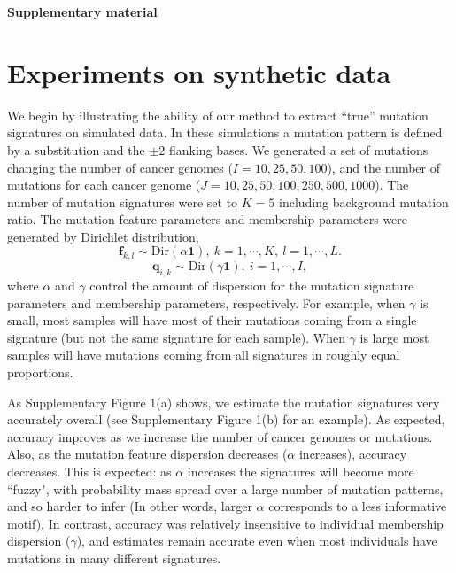 \documentclass{article}
\begin{document}

\vspace*{1.0cm}
{\LARGE \bf Supplementary material}
\vspace*{0.25cm}


\section*{Experiments on synthetic data}

We begin by illustrating the ability of our method to extract ``true'' mutation signatures on simulated data. In these simulations a mutation pattern
is defined by a substitution and the $\pm 2$ flanking bases.
We generated a set of mutations changing the number of cancer genomes ($I=10, 25, 50, 100$),  and the number of mutations for each cancer genome ($J=10, 25, 50, 100, 250, 500, 1000$).
The number of mutation signatures were set to $K=5$ including background mutation ratio.
The mutation feature parameters and membership parameters were generated by Dirichlet distribution,
\begin{equation}
\bm{f}_{k,l} \sim \text{Dir} (\alpha \bm{1} ),\ k = 1, \cdots, K,\  l = 1, \cdots, L.
\end{equation}
 \begin{equation}
 \bm{q}_{i, k} \sim \text{Dir} (\gamma \bm{1} ),\ i = 1, \cdots, I,
 \end{equation}
where $\alpha$ and $\gamma$ control the amount of dispersion 
for the mutation signature parameters and membership parameters, respectively.
For example, when $\gamma$ is small, most samples will have most of their
mutations coming from a single signature (but not the same signature for each sample). When $\gamma$ is large most samples will have mutations coming from all signatures in roughly equal proportions.

As Supplementary Figure 1(a) shows, we estimate the mutation signatures very accurately overall (see Supplementary Figure 1(b) for an example).
As expected, accuracy improves as we increase the number of cancer genomes or mutations.
Also, as the mutation feature dispersion decreases ($\alpha$ increases), accuracy decreases.
This is expected: as $\alpha$ increases the signatures will become more ``fuzzy", with
probability mass spread over a large number of mutation patterns, and so harder to infer
(In other words, larger $\alpha$ corresponds to a less informative motif).
In contrast, accuracy was relatively insensitive to 
individual membership dispersion ($\gamma$), and estimates remain accurate even when most individuals have mutations in many different signatures.
\end{document}
